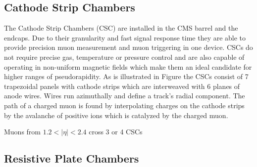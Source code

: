 \subsection{Cathode Strip Chambers}
The Cathode Strip Chambers (CSC) are installed in the CMS barrel and the endcaps.
Due to their granularity and fast signal response time they are able to provide precision muon 
measurement and muon triggering in one device. 
CSCs do not require precise gas, temperature or pressure control and
are also capable of operating
in non-uniform magnetic fields which make them an ideal candidate for higher
ranges of pseudorapidity. 
As is illustrated in Figure %
the CSCs consist of 7 trapezoidal panels with cathode strips which are interweaved with
6 planes of anode wires. Wires run azimuthally and define a track's 
radial component. The path of a charged muon is found by interpolating charges
on the cathode strips by the avalanche of positive ions which is catalyzed by
the charged muon. 

Muons from $1.2<|\eta|<2.4$ cross 3 or 4 CSCs
\subsection{Resistive Plate Chambers}
